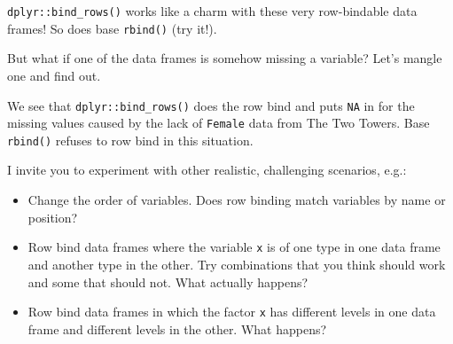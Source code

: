 \documentclass[
]{book}
\newenvironment{Shaded}{\begin{snugshade}}{\end{snugshade}}
\newcommand{\CommentTok}[1]{\textcolor[rgb]{0.56,0.35,0.01}{\textit{#1}}}
\newcommand{\DataTypeTok}[1]{\textcolor[rgb]{0.13,0.29,0.53}{#1}}
\newcommand{\KeywordTok}[1]{\textcolor[rgb]{0.13,0.29,0.53}{\textbf{#1}}}
\newcommand{\NormalTok}[1]{#1}
\newcommand{\OperatorTok}[1]{\textcolor[rgb]{0.81,0.36,0.00}{\textbf{#1}}}
\newcommand{\OtherTok}[1]{\textcolor[rgb]{0.56,0.35,0.01}{#1}}
\newcommand{\StringTok}[1]{\textcolor[rgb]{0.31,0.60,0.02}{#1}}
\providecommand{\tightlist}{%
  \setlength{\itemsep}{0pt}\setlength{\parskip}{0pt}}
\begin{document}
\texttt{dplyr::bind\_rows()} works like a charm with these very row-bindable data frames! So does base \texttt{rbind()} (try it!).

But what if one of the data frames is somehow missing a variable? Let's mangle one and find out.

\begin{Shaded}
\end{Shaded}

We see that \texttt{dplyr::bind\_rows()} does the row bind and puts \texttt{NA} in for the missing values caused by the lack of \texttt{Female} data from The Two Towers. Base \texttt{rbind()} refuses to row bind in this situation.

I invite you to experiment with other realistic, challenging scenarios, e.g.:

\begin{itemize}
\tightlist
\item
  Change the order of variables. Does row binding match variables by name or position?
\item
  Row bind data frames where the variable \texttt{x} is of one type in one data frame and another type in the other. Try combinations that you think should work and some that should not. What actually happens?
\item
  Row bind data frames in which the factor \texttt{x} has different levels in one data frame and different levels in the other. What happens?
\end{itemize}
\end{document}
